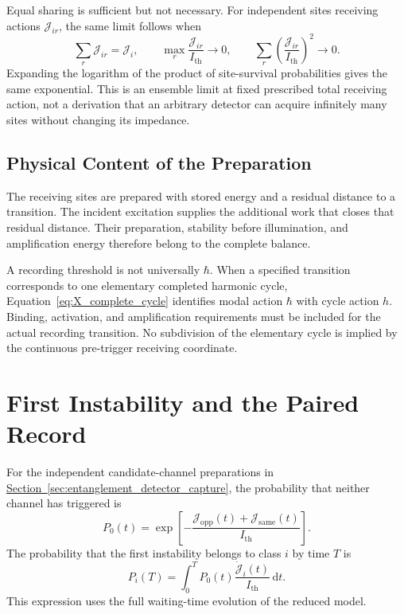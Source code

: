 Equal sharing is sufficient but not necessary. For independent sites receiving actions $\mathcal J_{ir}$, the same limit follows when
\begin{equation}
    \sum_r\mathcal J_{ir}=\mathcal J_i,
    \qquad
    \max_r\frac{\mathcal J_{ir}}{I_{\mathrm{th}}}\rightarrow0,
    \qquad
    \sum_r\left(\frac{\mathcal J_{ir}}{I_{\mathrm{th}}}\right)^2\rightarrow0.
\end{equation}
Expanding the logarithm of the product of site-survival probabilities gives the same exponential. This is an ensemble limit at fixed prescribed total receiving action, not a derivation that an arbitrary detector can acquire infinitely many sites without changing its impedance.

\subsection{Physical Content of the Preparation}

The receiving sites are prepared with stored energy and a residual distance to a transition. The incident excitation supplies the additional work that closes that residual distance. Their preparation, stability before illumination, and amplification energy therefore belong to the complete balance.

A recording threshold is not universally $\hbar$. When a specified transition corresponds to one elementary completed harmonic cycle, Equation~\eqref{eq:X_complete_cycle} identifies modal action $\hbar$ with cycle action $h$. Binding, activation, and amplification requirements must be included for the actual recording transition. No subdivision of the elementary cycle is implied by the continuous pre-trigger receiving coordinate.

\section{First Instability and the Paired Record}

For the independent candidate-channel preparations in \hyperref[sec:entanglement_detector_capture]{Section~\ref*{sec:entanglement_detector_capture}}, the probability that neither channel has triggered is
\begin{equation}
    P_0(t)
    =\exp\!\left[
       -\frac{\mathcal J_{\mathrm{opp}}(t)+\mathcal J_{\mathrm{same}}(t)}
       {I_{\mathrm{th}}}
      \right].
\end{equation}
The probability that the first instability belongs to class $i$ by time $T$ is
\begin{equation}
    \boxed{
    P_i(T)
    =\int_0^T P_0(t)
      \frac{\dot{\mathcal J}_i(t)}{I_{\mathrm{th}}}\,\mathrm dt
    }.
\end{equation}
This expression uses the full waiting-time evolution of the reduced model.

